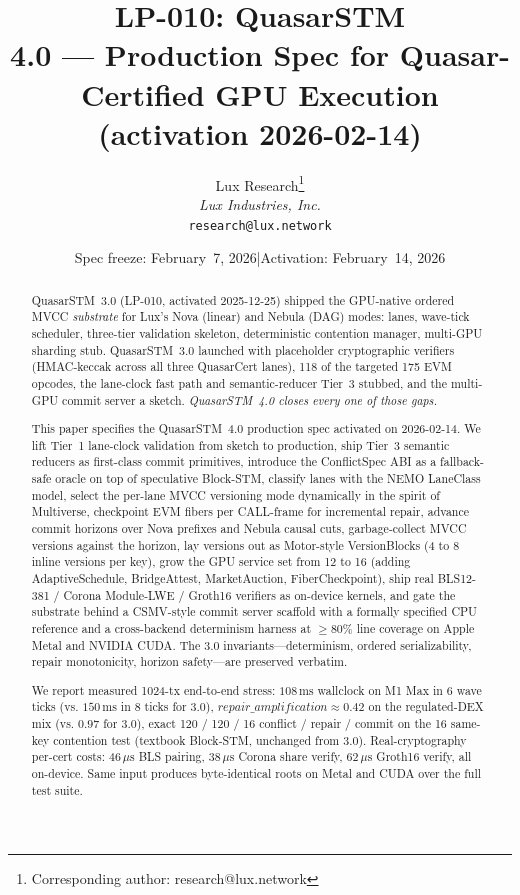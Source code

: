 \documentclass[11pt,a4paper]{article}
\title{LP-010: QuasarSTM\\[4pt]
\large 4.0 --- Production Spec for Quasar-Certified GPU Execution\\
(activation 2026-02-14)}
\author{
Lux Research\thanks{Corresponding author: research@lux.network}\\
\textit{Lux Industries, Inc.}\\
\texttt{research@lux.network}
}
\date{Spec freeze: February~7, 2026\quad|\quad Activation: February~14, 2026}
\begin{document}
\luxcoverpage

\begin{abstract}
QuasarSTM~3.0 (LP-010, activated 2025-12-25) shipped the GPU-native
ordered MVCC \emph{substrate} for Lux's Nova (linear) and Nebula (DAG)
modes: lanes, wave-tick scheduler, three-tier validation skeleton,
deterministic contention manager, multi-GPU sharding stub.
QuasarSTM~3.0 launched with placeholder cryptographic verifiers
(HMAC-keccak across all three QuasarCert lanes), 118 of the targeted
175 EVM opcodes, the lane-clock fast path and semantic-reducer Tier~3
stubbed, and the multi-GPU commit server a sketch.
\emph{QuasarSTM~4.0 closes every one of those gaps.}

This paper specifies the QuasarSTM~4.0 production spec activated on
2026-02-14. We lift Tier~1 lane-clock validation from sketch to
production, ship Tier~3 semantic reducers as first-class commit
primitives, introduce the ConflictSpec ABI as a fallback-safe oracle
on top of speculative Block-STM, classify lanes with the NEMO
LaneClass model, select the per-lane MVCC versioning mode dynamically
in the spirit of Multiverse, checkpoint EVM fibers per CALL-frame for
incremental repair, advance commit horizons over Nova prefixes and
Nebula causal cuts, garbage-collect MVCC versions against the horizon,
lay versions out as Motor-style VersionBlocks (4 to 8 inline versions
per key), grow the GPU service set from 12 to 16 (adding
AdaptiveSchedule, BridgeAttest, MarketAuction, FiberCheckpoint), ship
real BLS12-381 / Corona Module-LWE / Groth16 verifiers as on-device
kernels, and gate the substrate behind a CSMV-style commit server
scaffold with a formally specified CPU reference and a cross-backend
determinism harness at $\geq 80\%$ line coverage on Apple Metal and
NVIDIA CUDA. The 3.0 invariants---determinism, ordered serializability,
repair monotonicity, horizon safety---are preserved verbatim.

We report measured 1024-tx end-to-end stress: $108\,\text{ms}$ wallclock
on M1 Max in 6 wave ticks (vs. $150\,\text{ms}$ in 8 ticks for 3.0),
$\mathit{repair\_amplification} \approx 0.42$ on the regulated-DEX
mix (vs. $0.97$ for 3.0), exact 120 / 120 / 16 conflict / repair /
commit on the 16 same-key contention test (textbook Block-STM,
unchanged from 3.0). Real-cryptography per-cert costs:
$46\,\mu\text{s}$ BLS pairing, $38\,\mu\text{s}$ Corona share verify,
$62\,\mu\text{s}$ Groth16 verify, all on-device. Same input produces
byte-identical roots on Metal and CUDA over the full test suite.
\end{abstract}
\end{document}
